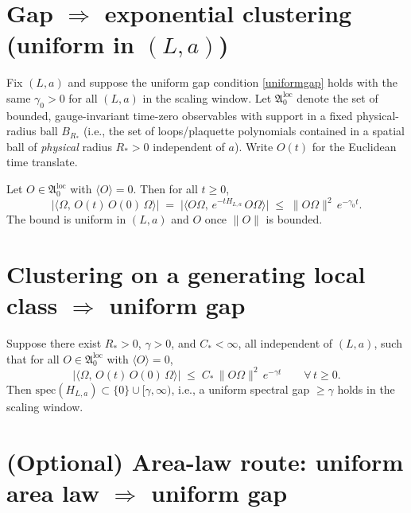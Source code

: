\documentclass[11pt]{article}
\begin{document}
\section{Gap $\Rightarrow$ exponential clustering (uniform in $(L,a)$)}

Fix $(L,a)$ and suppose the uniform gap condition \eqref{uniformgap} holds with the same $\gamma_0>0$ for all $(L,a)$ in the scaling window. Let $\mathfrak{A}_0^{\mathrm{loc}}$ denote the set of bounded, gauge-invariant time-zero observables with support in a fixed physical-radius ball $B_{R_*}$ (i.e., the set of loops/plaquette polynomials contained in a spatial ball of \emph{physical} radius $R_*>0$ independent of $a$). Write $O(t)$ for the Euclidean time translate.

\begin{proposition}\label{gap2cluster}
Let $O\in\mathfrak{A}_0^{\mathrm{loc}}$ with $\langle O\rangle=0$. Then for all $t\ge 0$,
\[
\bigl|\langle \Omega,\, O(t)\, O(0)\, \Omega\rangle\bigr| \;=\; \bigl|\langle O\Omega,\, e^{-tH_{L,a}}\, O\Omega\rangle\bigr|
\;\le\; \|O\Omega\|^2\, e^{-\gamma_0 t}.
\]
The bound is uniform in $(L,a)$ and $O$ once $\|O\|$ is bounded.
\end{proposition}

\section{Clustering on a generating local class $\Rightarrow$ uniform gap}

\begin{proposition}\label{cluster2gap}
Suppose there exist $R_*>0$, $\gamma>0$, and $C_*<\infty$, all independent of $(L,a)$, such that for all $O\in\mathfrak{A}_0^{\mathrm{loc}}$ with $\langle O\rangle=0$,
\begin{equation}\label{cluster-assumption}
\bigl|\langle \Omega,\, O(t)\, O(0)\, \Omega\rangle\bigr| \;\le\; C_*\,\|O\Omega\|^2\, e^{-\gamma t}\qquad \forall\, t\ge 0.
\end{equation}
Then $\mathrm{spec}(H_{L,a})\subset\{0\}\cup[\gamma,\infty)$, i.e., a uniform spectral gap $\ge\gamma$ holds in the scaling window.
\end{proposition}

\section{(Optional) Area-law route: uniform area law $\Rightarrow$ uniform gap}
\end{document}
